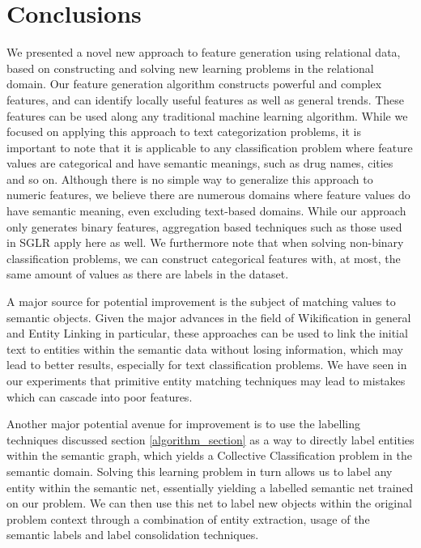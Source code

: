 \documentclass[twoside,11pt]{article}
\theoremstyle{definition}
\begin{document}
\section{Conclusions}

We presented a novel new approach to feature generation using relational data, based on constructing and solving new learning problems in the relational domain. 
Our feature generation algorithm constructs powerful and complex features, and can identify locally useful features as well as general trends. These features can be used along any traditional machine learning algorithm.
While we focused on applying this approach to text categorization problems, it is important to note that it is applicable to any classification problem where feature values are categorical and have semantic meanings, such as drug names, cities and so on. Although there is no simple way to generalize this approach to numeric features, we believe there are numerous domains where feature values do have semantic meaning, even excluding text-based domains.
While our approach only generates binary features, aggregation based techniques such as those used in SGLR apply here as well. We furthermore note that when solving non-binary classification problems, we can construct categorical features with, at most, the same amount of values as there are labels in the dataset.

A major source for potential improvement is the subject of matching values to semantic objects. Given the major advances in the field of Wikification \cite{bunescu2006using} in general and Entity Linking \cite{rao2013entity} in particular, these approaches can be used to link the initial text to entities within the semantic data without losing information, which may lead to better results, especially for text classification problems. We have seen in our experiments that primitive entity matching techniques may lead to mistakes which can cascade into poor features.

Another major potential avenue for improvement is to use the labelling techniques discussed section \ref{algorithm_section} as a way to directly label entities within the semantic graph, which yields a Collective Classification \cite{kajdanowicz2013collective} problem in the semantic domain. Solving this learning problem in turn allows us to label any entity within the semantic net, essentially yielding a labelled semantic net trained on our problem. We can then use this net to label new objects within the original problem context through a combination of entity extraction, usage of the semantic labels and label consolidation techniques.

\vskip 0.2in


%
%
\end{document}
